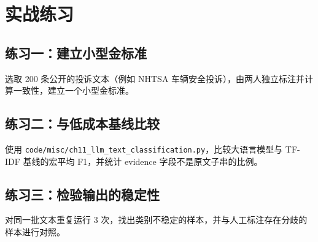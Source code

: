 \section{实战练习}

\subsection*{练习一：建立小型金标准}

选取 200 条公开的投诉文本（例如 NHTSA 车辆安全投诉），由两人独立标注并计算一致性，建立一个小型金标准。

\subsection*{练习二：与低成本基线比较}

使用 \texttt{code/misc/ch11\_llm\_text\_classification.py}，比较大语言模型与 TF-IDF 基线的宏平均 F1，并统计 evidence 字段不是原文子串的比例。

\subsection*{练习三：检验输出的稳定性}

对同一批文本重复运行 3 次，找出类别不稳定的样本，并与人工标注存在分歧的样本进行对照。

